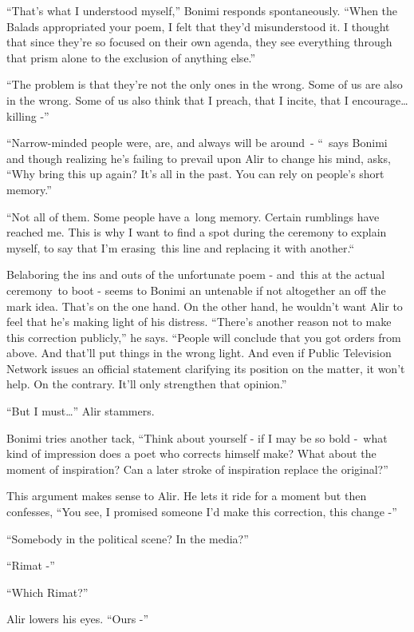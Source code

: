 \documentclass[twoside,11pt]{book}
\begin{document}
``That's what I understood myself,'' Bonimi responds spontaneously. ``When the
Balads appropriated your poem, I felt that they'd misunderstood it. I thought that since they're so focused on their
own agenda, they see everything through that prism alone to the exclusion of anything else.'' 

``The problem is that they're not the only ones in the wrong. Some of us are also in the wrong. Some of us
also think that I preach, that I incite, that I encourage{\dots} killing -'' 

``Narrow-minded people were, are, and always will be around\ {}- ``\ says Bonimi and though
realizing he's failing to prevail upon Alir to change his mind, asks, ``Why bring this up again? It's all
in the past. You can rely on people's short memory.'' 

``Not all of them. Some people have a~long memory. Certain rumblings have reached me. This is why I want to
find a spot during the ceremony to explain myself, to say that I'm erasing~this line and replacing it with
another.``\ 

Belaboring the ins and outs of the unfortunate poem -  and\ this at the actual ceremony\ to boot - seems to Bonimi an
untenable if not altogether an off the mark idea. That's on the one hand. On the other hand, he wouldn't want Alir to
feel that he's making light of his distress. ``There's another reason not to make this correction
publicly,'' he says. ``People will conclude that you got orders from above. And that{}'ll put things in the wrong
light. And even if Public Television Network issues an official statement clarifying its position on the matter, it
won't help. On the contrary. It'll only strengthen that opinion.'' 

``But I must{\dots}'' Alir stammers. 

Bonimi tries another tack, ``Think about yourself - if I may be so bold -\ what kind of impression does a
poet who corrects himself make? What about the moment of inspiration? Can a later stroke of inspiration replace the
original?'' 

This argument makes sense to Alir. He lets it ride for a moment but then confesses, ``You see, I promised
someone I'd make this correction, this change -'' 

``Somebody in the political scene? In the media?'' 

``Rimat -'' 

``Which Rimat?'' 

Alir lowers his eyes. ``Ours -'' 
\end{document}
